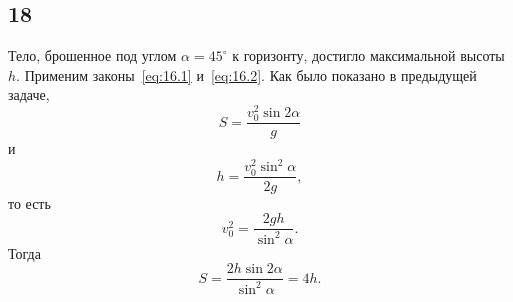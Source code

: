 \subsection{18}

Тело, брошенное под углом $\alpha=45^\circ$ к горизонту, достигло максимальной высоты~$h$. Применим законы~\eqref{eq:16.1} и~\eqref{eq:16.2}. Как было показано в предыдущей задаче,
\[
S=\frac{v_0^2\sin2\alpha}{g}
\]
и
\[
h=\frac{v_0^2\sin^2\alpha}{2g},
\]
то есть
\[
v^2_0=\frac{2gh}{\sin^2\alpha}.
\]
Тогда
\[
S=\frac{2h\sin2\alpha}{\sin^2\alpha}=4h.
\]